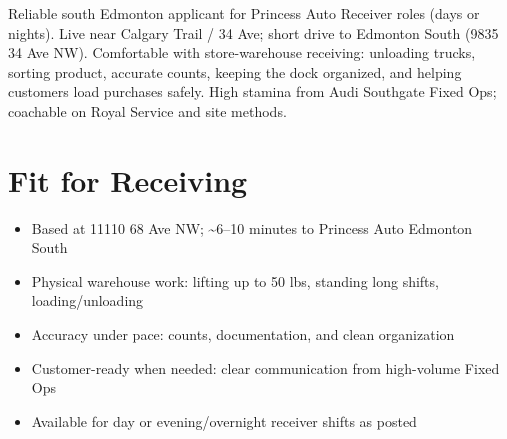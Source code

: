 \documentclass[11pt,a4paper,sans]{moderncv}
\begin{document}
\makecvtitle

\vspace{4pt}
\small{Reliable south Edmonton applicant for Princess Auto Receiver roles (days or nights). Live near Calgary Trail / 34 Ave; short drive to Edmonton South (9835 34 Ave NW). Comfortable with store-warehouse receiving: unloading trucks, sorting product, accurate counts, keeping the dock organized, and helping customers load purchases safely. High stamina from Audi Southgate Fixed Ops; coachable on Royal Service and site methods.}

\section{Fit for Receiving}
\vspace{1pt}
\begin{itemize}
\item Based at 11110 68 Ave NW; \textasciitilde6--10 minutes to Princess Auto Edmonton South
\item Physical warehouse work: lifting up to 50 lbs, standing long shifts, loading/unloading
\item Accuracy under pace: counts, documentation, and clean organization
\item Customer-ready when needed: clear communication from high-volume Fixed Ops
\item Available for day or evening/overnight receiver shifts as posted
\end{itemize}
\end{document}
